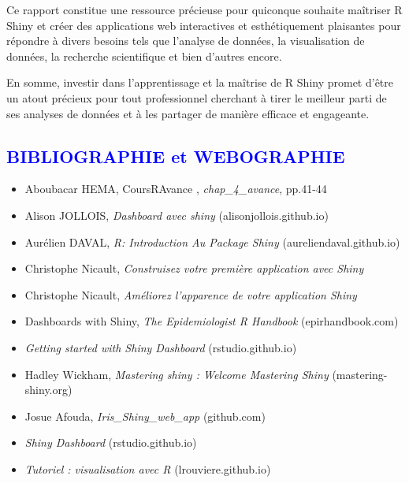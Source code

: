 \documentclass[
]{article}
\begin{document}
Ce rapport constitue une ressource précieuse pour quiconque souhaite
maîtriser R Shiny et créer des applications web interactives et
esthétiquement plaisantes pour répondre à divers besoins tels que
l'analyse de données, la visualisation de données, la recherche
scientifique et bien d'autres encore.

En somme, investir dans l'apprentissage et la maîtrise de R Shiny promet
d'être un atout précieux pour tout professionnel cherchant à tirer le
meilleur parti de ses analyses de données et à les partager de manière
efficace et engageante.

\newpage

\textcolor{blue}{\section*{BIBLIOGRAPHIE et WEBOGRAPHIE}}

\begin{itemize}
\item
  Aboubacar HEMA, CoursRAvance , \emph{chap\_4\_avance}, pp.41-44
\item
  Alison JOLLOIS, \emph{Dashboard avec shiny} (alisonjollois.github.io)
\item
  Aurélien DAVAL, \emph{R: Introduction Au Package Shiny}
  (aureliendaval.github.io)
\item
  Christophe Nicault, \emph{Construisez votre première application avec
  Shiny}
\item
  Christophe Nicault, \emph{Améliorez l'apparence de votre application
  Shiny}
\item
  Dashboards with Shiny, \emph{The Epidemiologist R Handbook}
  (epirhandbook.com)
\item
  \emph{Getting started with Shiny Dashboard} (rstudio.github.io)
\item
  Hadley Wickham, \emph{Mastering shiny : Welcome \textbar{} Mastering
  Shiny} (mastering-shiny.org)
\item
  Josue Afouda, \emph{Iris\_Shiny\_web\_app} (github.com)
\item
  \emph{Shiny Dashboard} (rstudio.github.io)
\item
  \emph{Tutoriel : visualisation avec R} (lrouviere.github.io)
\end{itemize}
\end{document}
